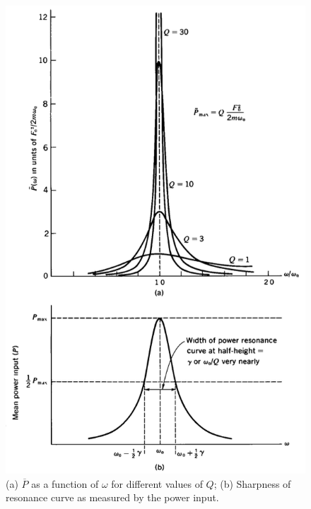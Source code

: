 \begin{fullwidth}
	\begin{figure}
		\centering
		\includegraphics[scale=0.65]{phys232/Ch4-P-w-vs-Q.png} \caption{(a) $\overline{P}$ as a function of $\omega$ for different values of $Q$; (b) Sharpness of resonance curve as measured by the power input.}	\label{ch4:fig-P-w-vs-Q}
	\end{figure}
\end{fullwidth}